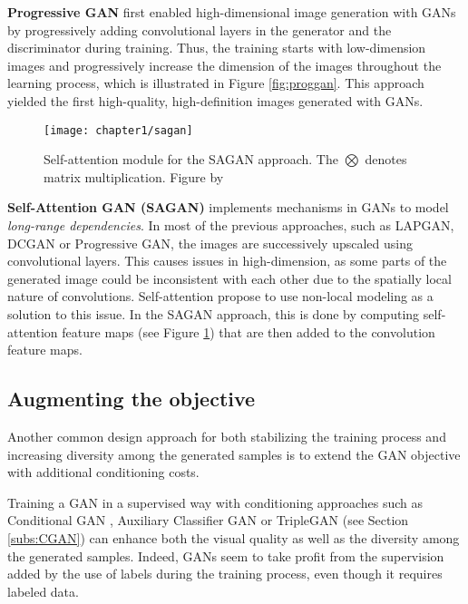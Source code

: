 \textbf{Progressive GAN} \citep{Karras2017} first enabled high-dimensional image generation with GANs by progressively adding convolutional layers in the generator and the discriminator during training. Thus, the training starts with low-dimension images and progressively increase the dimension of the images throughout the learning process, which is illustrated in Figure \ref{fig:proggan}. This approach yielded the first high-quality, high-definition images generated with \ac{GANs}.

\begin{figure}
	\centering
	\texttt{[image: chapter1/sagan]}
	\caption[Self-attention module]{Self-attention module for the SAGAN approach. The $\bigotimes$ denotes matrix multiplication. Figure by \citet{Zhang2018}}
	\label{fig:sagan}
\end{figure}

\textbf{Self-Attention GAN (SAGAN)} \citep{Zhang2018} implements  mechanisms in \ac{GANs} to model \textit{long-range dependencies}. In most of the previous approaches, such as LAPGAN, DCGAN or Progressive GAN, the images are successively upscaled using convolutional layers. This causes issues in high-dimension, as some parts of the generated image could be inconsistent with each other due to the spatially local nature of convolutions. Self-attention propose to use non-local modeling as a solution to this issue. In the SAGAN approach, this is done by computing self-attention feature maps (see Figure \ref{fig:sagan}) that are then added to the convolution feature maps. 

\subsection{Augmenting the objective}
\label{subs:augmented_objectives}

Another common design approach for both stabilizing the training process and increasing diversity among the generated samples is to extend the \ac{GAN} objective with additional conditioning costs.

Training a \ac{GAN} in a supervised way with conditioning approaches such as Conditional GAN \citep{Mirza2014}, Auxiliary Classifier GAN \citep{Odena2016} or TripleGAN \citep{Li2017} (see Section \ref{subs:CGAN}) can enhance both the visual quality as well as the diversity among the generated samples. Indeed, GANs seem to take profit from the supervision added by the use of labels during the training process, even though it requires labeled data.

